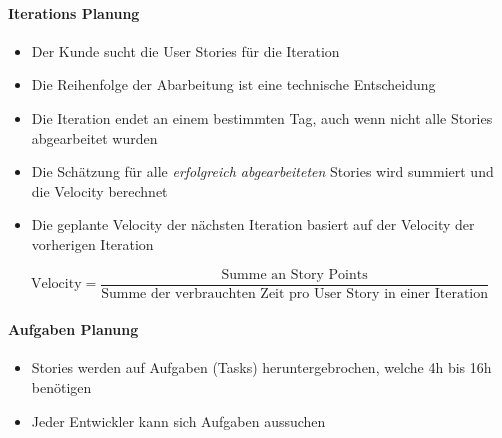 \documentclass[
    ngerman,
    color=3b,
    summary,
    boxarc,
    main,
]{rubos-tuda-template}
\begin{document}
\paragraph{Iterations Planung}
\begin{itemize}
    \item Der Kunde sucht die User Stories für die Iteration
    \item Die Reihenfolge der Abarbeitung ist eine technische Entscheidung
    \item Die Iteration endet an einem bestimmten Tag, auch wenn nicht alle Stories abgearbeitet wurden
    \item Die Schätzung für alle \textit{erfolgreich abgearbeiteten} Stories wird summiert und die Velocity berechnet
    \item Die geplante Velocity der nächsten Iteration basiert auf der Velocity der vorherigen Iteration
\end{itemize}

\begin{equation*}
    \text{Velocity} = \frac{\text{Summe an Story Points}}{\text{Summe der verbrauchten Zeit pro User Story in einer Iteration}}
\end{equation*}

\paragraph{Aufgaben Planung}
\begin{itemize}
    \item Stories werden auf Aufgaben (Tasks) heruntergebrochen, welche 4h bis 16h benötigen
    \item Jeder Entwickler kann sich Aufgaben aussuchen
\end{itemize}


\clearpage
\end{document}

